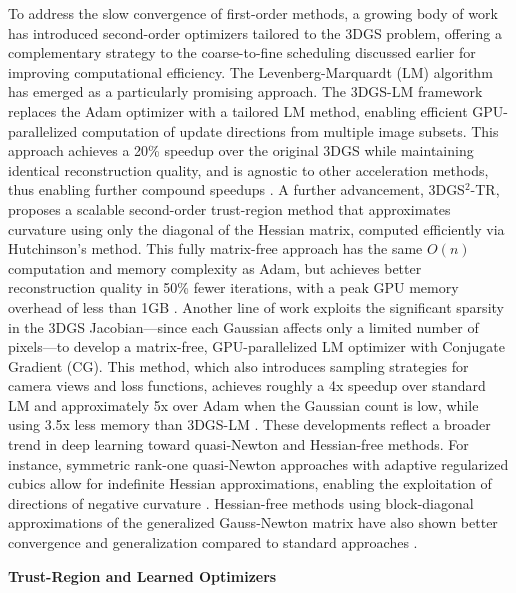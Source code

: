 \documentclass[11pt]{article}
\begin{document}
To address the slow convergence of first-order methods, a growing body of work has introduced second-order optimizers tailored to the 3DGS problem, offering a complementary strategy to the coarse-to-fine scheduling discussed earlier for improving computational efficiency. The Levenberg-Marquardt (LM) algorithm has emerged as a particularly promising approach. The 3DGS-LM framework replaces the Adam optimizer with a tailored LM method, enabling efficient GPU-parallelized computation of update directions from multiple image subsets. This approach achieves a 20\% speedup over the original 3DGS while maintaining identical reconstruction quality, and is agnostic to other acceleration methods, thus enabling further compound speedups \cite{ref157}. A further advancement, 3DGS\(^2\)-TR, proposes a scalable second-order trust-region method that approximates curvature using only the diagonal of the Hessian matrix, computed efficiently via Hutchinson's method. This fully matrix-free approach has the same \(O(n)\) computation and memory complexity as Adam, but achieves better reconstruction quality in 50\% fewer iterations, with a peak GPU memory overhead of less than 1GB \cite{ref158}. Another line of work exploits the significant sparsity in the 3DGS Jacobian---since each Gaussian affects only a limited number of pixels---to develop a matrix-free, GPU-parallelized LM optimizer with Conjugate Gradient (CG). This method, which also introduces sampling strategies for camera views and loss functions, achieves roughly a 4x speedup over standard LM and approximately 5x over Adam when the Gaussian count is low, while using 3.5x less memory than 3DGS-LM \cite{ref159}. These developments reflect a broader trend in deep learning toward quasi-Newton and Hessian-free methods. For instance, symmetric rank-one quasi-Newton approaches with adaptive regularized cubics allow for indefinite Hessian approximations, enabling the exploitation of directions of negative curvature \cite{ref160}. Hessian-free methods using block-diagonal approximations of the generalized Gauss-Newton matrix have also shown better convergence and generalization compared to standard approaches \cite{ref161}.

\textbf{Trust-Region and Learned Optimizers}
\end{document}
